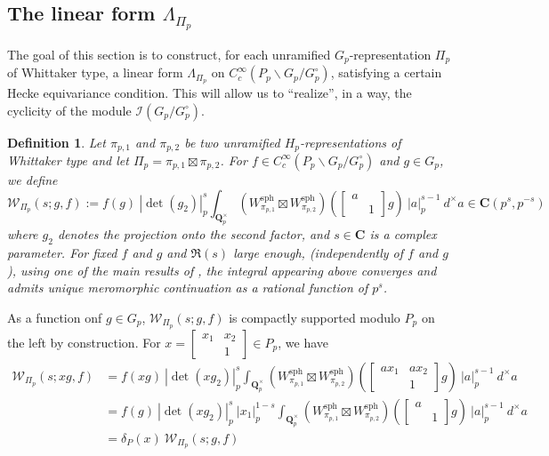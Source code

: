 \documentclass{amsart}%
\theoremstyle{plain}
\theoremstyle{plain}
\newtheorem{defn}[thm]{Definition}
\theoremstyle{remark}
\begin{document}
\subsection{The linear form $\Lambda_{\Pi_p}$}\label{sec the linear form} The goal of this section is to construct, for each unramified $G_p$-representation $\Pi_p$ of Whittaker type, a linear form $\Lambda_{\Pi_p}$ on $C_c^\infty(P_p\backslash G_p/G_p^\circ)$, satisfying a certain Hecke equivariance condition. This will allow us to ``realize'', in a way, the cyclicity of the module $\mathcal{I}(G_p/G_p^\circ)$. 
\begin{defn}\label{def W}
    Let $\pi_{p,1}$ and $\pi_{p,2}$ be two unramified $H_p$-representations of Whittaker type and let $\Pi_p=\pi_{p,1}\boxtimes \pi_{p,2}$. For $f\in C_c^\infty(P_p\backslash G_p/G_p^\circ)$ and $g\in G_p$, we define 
    $$\mathscr{W}_{\Pi_p}(s;g,f):=f(g)\ |\det(g_2)|_p^s\int_{\mathbf{Q}_p^\times}\left(W_{\pi_{p,1}}^\mathrm{sph}\boxtimes W_{\pi_{p,2}}^\mathrm{sph}\right)\left(\left[\begin{smallmatrix}
        a & \\
        & 1
    \end{smallmatrix}\right]g\right)\ |a|_p^{s-1}\ d^\times a\in \mathbf{C}(p^s,p^{-s})$$
    where $g_2$ denotes the projection onto the second factor, and $s\in\mathbf{C}$ is a complex parameter. For fixed $f$ and $g$ and $\Re(s)$ large enough, (independently of $f$ and $g$), using one of the main results of \cite{jacquet1983rankin}, the integral appearing above converges and admits unique meromorphic continuation as a rational function of $p^s$.
\end{defn}
\noindent  
As a function onf $g\in G_p$, $\mathscr{W}_{\Pi_p}(s;g,f)$ is compactly supported modulo $P_p$ on the left by construction. For $x=\left[\begin{smallmatrix}
    x_1 & x_2\\
     & 1
\end{smallmatrix}\right]\in P_p$, we have 
\begin{align}\label{eq: 13}
    \mathscr{W}_{\Pi_p}(s;xg,f)&=f(xg)\ |\det(xg_2)|_p^s\int_{\mathbf{Q}_p^\times} \left(W_{\pi_{p,1}}^\mathrm{sph}\boxtimes W_{\pi_{p,2}}^\mathrm{sph}\right)\left(\left[\begin{smallmatrix}
        ax_1 & ax_2 \\
        & 1
    \end{smallmatrix}\right]g\right)\ |a|_p^{s-1}\ d^\times a\\
    \nonumber &=f(g)\ |\det(xg_2)|_p^s\  |x_1|_p^{1-s}\int_{\mathbf{Q}_p^\times} \left(W_{\pi_{p,1}}^\mathrm{sph}\boxtimes W_{\pi_{p,2}}^\mathrm{sph}\right)\left(\left[\begin{smallmatrix}
        a & \\
        & 1
    \end{smallmatrix}\right]g\right)\ |a|_p^{s-1}\ d^\times a\\
    \nonumber &=\delta_P(x)\  \mathscr{W}_{\Pi_p}(s;g,f)
\end{align}
\end{document}
